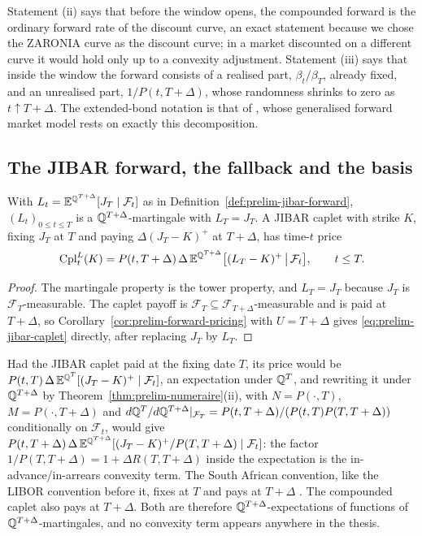 \documentclass[../../../main.tex]{subfiles}
\begin{document}
Statement (ii) says that before the window opens, the compounded forward is the ordinary forward rate of the discount curve, an exact statement because we chose the ZARONIA curve as the discount curve; in a market discounted on a different curve it would hold only up to a convexity adjustment. Statement (iii) says that inside the window the forward consists of a realised part, $\beta_t/\beta_T$, already fixed, and an unrealised part, $1/P(t,T+\Delta)$, whose randomness shrinks to zero as $t\uparrow T+\Delta$. The extended-bond notation is that of \cite{lyashenko2019}, whose generalised forward market model rests on exactly this decomposition.

\subsection{The JIBAR forward, the fallback and the basis}

\begin{proposition}\label{prop:prelim-L-mart}
With $L_t=\mathbb{E}^{\mathbb{Q}^{T+\Delta}}[J_T\mid\mathcal F_t]$ as in Definition~\ref{def:prelim-jibar-forward}, $(L_t)_{0\le t\le T}$ is a $\mathbb{Q}^{T+\Delta}$-martingale with $L_T=J_T$. A JIBAR caplet with strike $K$, fixing $J_T$ at $T$ and paying $\Delta(J_T-K)^+$ at $T+\Delta$, has time-$t$ price
\begin{equation}\label{eq:prelim-jibar-caplet}
\mathrm{Cpl}^{L}_t(K)=P(t,T+\Delta)\,\Delta\,\mathbb{E}^{\mathbb{Q}^{T+\Delta}}\big[(L_T-K)^+\,\big|\,\mathcal F_t\big],\qquad t\le T .
\end{equation}
\end{proposition}

\begin{proof}
The martingale property is the tower property, and $L_T=J_T$ because $J_T$ is $\mathcal F_T$-measurable. The caplet payoff is $\mathcal F_T\subseteq\mathcal F_{T+\Delta}$-measurable and is paid at $T+\Delta$, so Corollary~\ref{cor:prelim-forward-pricing} with $U=T+\Delta$ gives \eqref{eq:prelim-jibar-caplet} directly, after replacing $J_T$ by $L_T$.
\end{proof}

\begin{remark}\label{rem:prelim-no-convexity}
Had the JIBAR caplet paid at the fixing date $T$, its price would be $P(t,T)\,\Delta\,\mathbb{E}^{\mathbb{Q}^{T}}[(J_T-K)^+\mid\mathcal F_t]$, an expectation under $\mathbb{Q}^{T}$, and rewriting it under $\mathbb{Q}^{T+\Delta}$ by Theorem~\ref{thm:prelim-numeraire}(ii), with $N=P(\cdot,T)$, $M=P(\cdot,T+\Delta)$ and $d\mathbb{Q}^{T}/d\mathbb{Q}^{T+\Delta}|_{\mathcal F_T}=P(t,T+\Delta)/(P(t,T)P(T,T+\Delta))$ conditionally on $\mathcal F_t$, would give $P(t,T+\Delta)\,\Delta\,\mathbb{E}^{\mathbb{Q}^{T+\Delta}}[(J_T-K)^+/P(T,T+\Delta)\mid\mathcal F_t]$: the factor $1/P(T,T+\Delta)=1+\Delta R(T,T+\Delta)$ inside the expectation is the in-advance/in-arrears convexity term. The South African convention, like the LIBOR convention before it, fixes at $T$ and pays at $T+\Delta$ \cite{sarb2024conv}. The compounded caplet also pays at $T+\Delta$. Both are therefore $\mathbb{Q}^{T+\Delta}$-expectations of functions of $\mathbb{Q}^{T+\Delta}$-martingales, and no convexity term appears anywhere in the thesis.
\end{remark}
\end{document}
